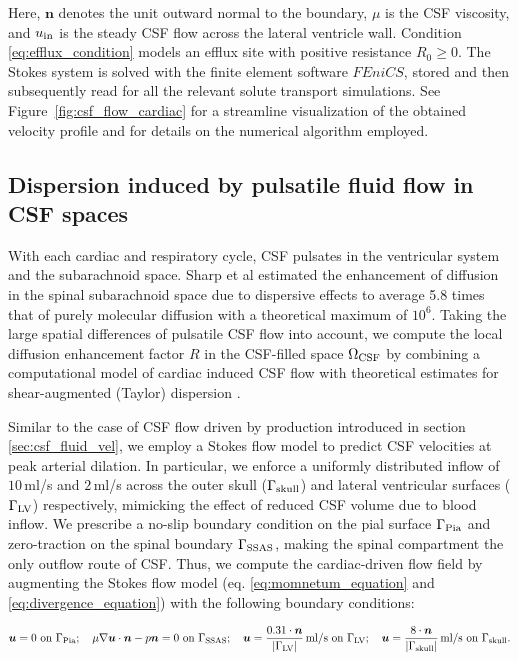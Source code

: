 \documentclass[fleqn,10pt]{wlscirep}
\begin{document}
Here, $\bm n$ denotes the unit outward normal to the boundary, $\mu$ is the CSF viscosity, and $u_{\rm in}$ is the steady CSF flow across the lateral ventricle wall. Condition \eqref{eq:efflux_condition} models an efflux site with positive resistance $R_0 \geq 0$. The Stokes system is solved with the finite element software $FEniCS$, stored and then subsequently read for all the relevant solute transport simulations. See Figure~\ref{fig:csf_flow_cardiac} for a streamline visualization of the obtained velocity profile and  for details on the numerical algorithm employed.



\subsection*{Dispersion induced by pulsatile fluid flow in CSF spaces}

With each cardiac and respiratory cycle, CSF pulsates in the ventricular system and the subarachnoid space. Sharp et al \cite{keith2019dispersion} estimated the enhancement of diffusion in the spinal subarachnoid space due to dispersive effects to average 5.8 times that of purely molecular diffusion with a theoretical maximum of $10^6$. Taking the large spatial differences of pulsatile CSF flow into account, we compute the local diffusion enhancement factor $R$ in the CSF-filled space $\Omega_{\rm CSF}$ by combining a computational model of cardiac induced CSF flow with theoretical estimates for shear-augmented (Taylor) dispersion \cite{taylor1953dispersion, watson1983diffusion}.

Similar to the case of CSF flow driven by production introduced in section \ref{sec:csf_fluid_vel}, we employ a Stokes flow model to predict CSF velocities at peak arterial dilation. In particular, we enforce a uniformly distributed inflow of $10$\,ml/s and $2$\,ml/s across the outer skull ($\Gamma_{\rm skull}$) and lateral ventricular surfaces ($\Gamma_{\rm LV}$) respectively, mimicking the effect of reduced CSF volume due to blood inflow. We prescribe a no-slip boundary condition on the pial surface $\Gamma_{\rm Pia}$ and zero-traction on the spinal boundary $\Gamma_{\rm SSAS}$, making the spinal compartment the only outflow route of CSF. Thus, we compute the cardiac-driven flow field by augmenting the Stokes flow model (eq. \ref{eq:momnetum_equation} and \ref{eq:divergence_equation}) with the following boundary conditions:

\begin{equation}\label{eq:cardiac_flow_bcs}
    \bm u = 0 \text{ on } \Gamma_{\rm Pia}; \quad 
    \mu \nabla \bm u \cdot \bm n - p \bm n = 0 \text{ on } \Gamma_{\rm SSAS}; \quad 
    \bm u = \frac{0.31 \cdot \bm n}{|\Gamma_{\rm LV}|} \,\text{ml/s} \text{ on } \Gamma_{\rm LV}; \quad
    \bm u = \frac{8 \cdot \bm n}{|\Gamma_{\rm skull}|} \,\text{ml/s} \text{ on } \Gamma_{\rm skull}.
\end{equation}
\end{document}
